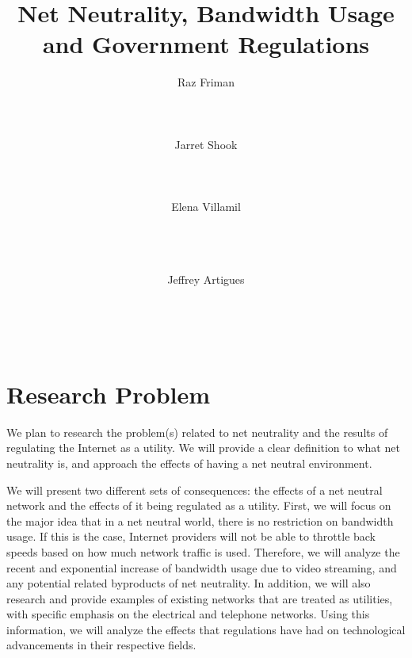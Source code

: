 \documentclass{sigcomm-alternate}
\begin{document}
\title{Net Neutrality, Bandwidth Usage and Government Regulations}
	

\author{
	\alignauthor
	Raz Friman\\
	\\
	\\
	\\
	\alignauthor
	Jarret Shook\\
	\\
	\\
	\\
	\alignauthor Elena Villamil\\
	\\
	\\
	\\
	\and  %
	\alignauthor Jeffrey Artigues\\
	\\
	\\
	\\
}

\maketitle


\section{Research Problem}
We plan to research the problem(s) related to net neutrality and the results of regulating the Internet as a utility. We will provide a clear definition to what net neutrality is, and approach the effects of having a net neutral environment. 

We will present two different sets of consequences: the effects of a net neutral network and the effects of it being regulated as a utility. First, we will focus on the major idea that in a net neutral world, there is no restriction on bandwidth usage. If this is the case, Internet providers will not be able to throttle back speeds based on how much network traffic is used. Therefore, we will analyze the recent and exponential increase of bandwidth usage due to video streaming, and any potential related byproducts of net neutrality. In addition, we will also research and provide examples of existing networks that are treated as utilities, with specific emphasis on the electrical and telephone networks. Using this information, we will analyze the effects that regulations have had on technological advancements in their respective fields. 
\end{document}
